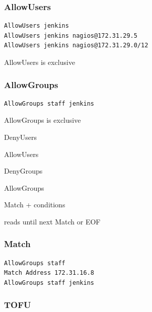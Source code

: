 \begin{frame}[fragile]
\frametitle{AllowUsers}
\lstset{basicstyle=\large\fsfont}
\begin{lstlisting}
AllowUsers jenkins
AllowUsers jenkins nagios@172.31.29.5
AllowUsers jenkins nagios@172.31.29.0/12
\end{lstlisting}
\begin{center}AllowUsers is exclusive\end{center}

\end{frame}
\begin{frame}[fragile]
\frametitle{AllowGroups}
\lstset{basicstyle=\large\fsfont}
\begin{lstlisting}
AllowGroups staff jenkins
\end{lstlisting}
\begin{center}AllowGroups is exclusive\end{center}

\end{frame}
\begin{iframe}
\item DenyUsers
\item AllowUsers
\item DenyGroups
\item AllowGroups
    \end{iframe}
    \begin{iframe}[Match]
    \item Match + conditions
    \item reads until next Match or EOF
    \end{iframe}

\begin{frame}[fragile]
\frametitle{Match}
\lstset{basicstyle=\large\fsfont}
\begin{lstlisting}
AllowGroups staff
Match Address 172.31.16.8
AllowGroups staff jenkins
\end{lstlisting}
\end{frame}


\begin{frame}[fragile]
\frametitle{TOFU}
\lstset{basicstyle=\large\fsfont}

\end{frame}

